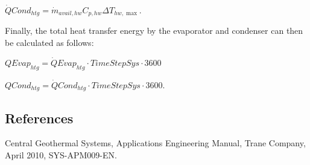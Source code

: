 \textbf{\emph{\(\dot QCon{d_{htg}} = {\dot m_{avail,hw}}{C_{p,hw}}\Delta {T_{hw,\max }}\)}}.

Finally, the total heat transfer energy by the evaporator and condenser can then be calculated as follows:

\textbf{\emph{\(QEva{p_{htg}} = \dot QEva{p_{htg}} \cdot TimeStepSys \cdot 3600\)}}

\textbf{\emph{\(QCon{d_{htg}} = \dot QCon{d_{htg}} \cdot TimeStepSys \cdot 3600\)}}.

\subsection{References}\label{references-008}

Central Geothermal Systems, Applications Engineering Manual, Trane Company, April 2010, SYS-APM009-EN.
